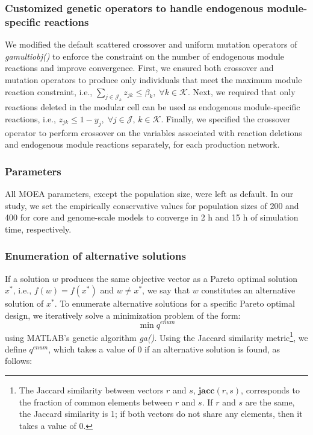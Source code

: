 \subsubsection{Customized genetic operators to handle endogenous module-specific reactions} \label{sec:customOp}
We modified the default scattered crossover and uniform mutation operators of \textit{gamultiobj()} to enforce the constraint on the number of endogenous module reactions and improve convergence. First, we ensured both crossover and mutation operators to produce only individuals that meet the maximum module reaction constraint, i.e., $\sum_{j \in \mathcal{J}_k} z_{jk} \le \beta_k, \; \forall k \in \mathcal{K}$. Next, we required that only reactions deleted in the modular cell can be used as endogenous module-specific reactions, i.e., $z_{jk} \le 1- y_j, \; \forall j \in \mathcal{J}, \, k \in \mathcal{K}$. Finally, we specified the crossover operator to perform crossover on the variables associated with reaction deletions and endogenous module reactions separately, for each production network.

\subsubsection{Parameters} \label{sec:MOPparameters}
All MOEA parameters, except the population size, were left as default. In our study, we set the empirically conservative values for population sizes of 200 and 400 for core and genome-scale models to converge in 2 h and 15 h of simulation time, respectively.



\subsubsection{Enumeration of alternative solutions}
If a solution $w$ produces the same objective vector as a Pareto optimal solution $x^*$, i.e., $f(w)=f(x^*)$ and $w \ne x^*$, we say that $w$ constitutes an alternative solution of $x^*$. To enumerate alternative solutions for a specific Pareto optimal design, we iteratively solve a minimization problem of the form:
\begin{equation}
\min q^{enum}
\end{equation}
\noindent using MATLAB's genetic algorithm \textit{ga()}. Using the Jaccard similarity metric\footnote{The Jaccard similarity between vectors $r$ and $s$, $\textbf{jacc}(r,s)$,  corresponds to the fraction of common elements between $r$ and $s$. If $r$ and $s$ are the same, the Jaccard similarity is 1; if both vectors do not share any elements, then it takes a value of 0.}, we define $q^{enum}$, which takes a value of 0 if an alternative solution is found, as follows:

